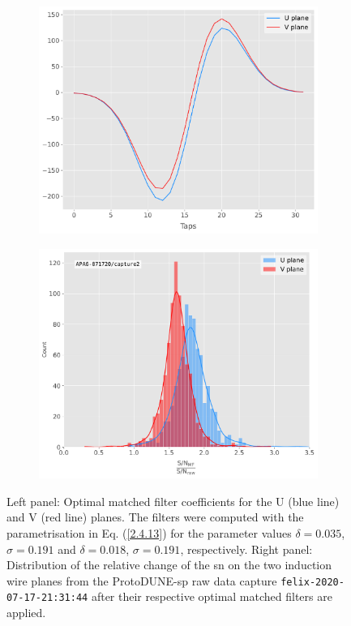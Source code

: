 \begin{figure}[t]
	\begin{subfigure}{0.5\textwidth}
		\centering
		\includegraphics[width=.99\linewidth]{Images/Matched_Filter/optimal_coeffs}
	\end{subfigure}
	\begin{subfigure}{0.5\textwidth}
		\centering
		\includegraphics[width=.99\linewidth]{Images/Matched_Filter/improvement_capture}
	\end{subfigure}
	\caption[Distribution of the change in the \gls{sn} on the induction planes from the ProtoDUNE-\gls{sp} raw data capture after the optimal matched filters are applied.]{Left panel: Optimal matched filter coefficients for the U (blue line) and V (red line) planes. The filters were computed with the parametrisation in Eq. (\ref{2.4.13}) for the parameter values $\delta = 0.035$, $\sigma = 0.191$ and $\delta = 0.018$, $\sigma = 0.191$, respectively. Right panel: Distribution of the relative change of the \gls{sn} on the two induction wire planes from the ProtoDUNE-\gls{sp} raw data capture \texttt{felix-2020-07-17-21:31:44} after their respective optimal matched filters are applied.}
	\label{fig:mf_perf}
\end{figure}

